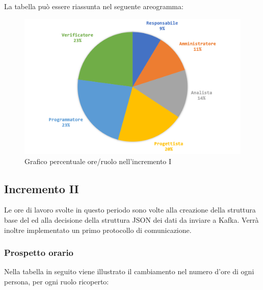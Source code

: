			La tabella può essere riassunta nel seguente areogramma:
			\begin{figure}[H]
				\centering
				\includegraphics[width=0.8\linewidth]{images/consuntivo/ConsIncr1-2.png}
				\caption{Grafico percentuale ore/ruolo nell'incremento I}
				\label{fig:consuntivo grafico costi ruolo incremento I}
			\end{figure}
			\pagebreak
		

		\subsection{Incremento II }
		Le ore di lavoro svolte in questo periodo sono volte alla creazione della struttura base del  ed alla decisione della struttura JSON dei dati da inviare a Kafka. Verrà inoltre implementato un primo protocollo di comunicazione.
		\subsubsection{Prospetto orario}
			Nella tabella in seguito viene illustrato il cambiamento nel numero d'ore di ogni persona, per ogni ruolo ricoperto:
			
